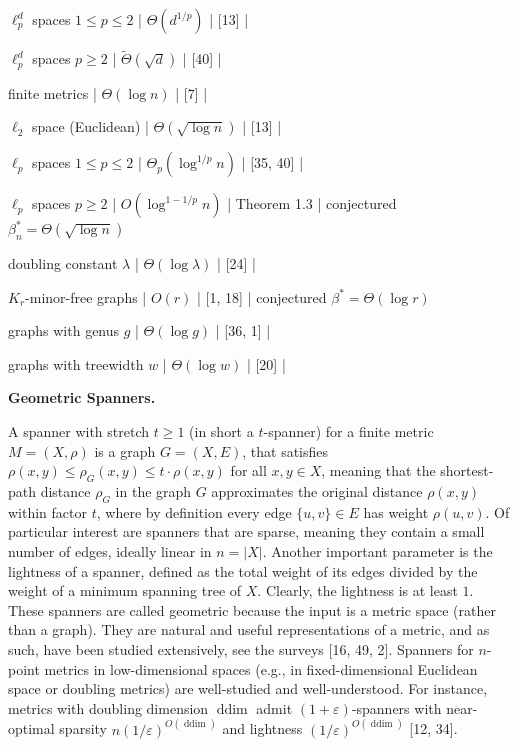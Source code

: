 \documentclass[10pt,a4paper]{amsart}
\begin{document}
\noindent  $\ell_{p}^{d}$ spaces $1\leq p\leq 2$  | $\Theta(d^{1/p})$ | [13] | \par
\noindent  $\ell_{p}^{d}$ spaces $p\geq 2$  | $\tilde{\Theta}(\sqrt{d})$ | [40] | \par
\noindent finite metrics | $\Theta(\log{n})$ | [7] | \par
\noindent  $\ell_{2}$ space (Euclidean) | $\Theta(\sqrt{\log{n}})$ | [13] | \par
\noindent  $\ell_{p}$ spaces $1\leq p\leq 2$  | $\Theta_{p}(\log^{1/p}{n})$ | [35, 40] | \par
\noindent  $\ell_{p}$ spaces $p\geq 2$  | $O(\log^{1-1/p}{n})$ | Theorem 1.3 | conjectured $\beta^{*}_{n}=\Theta(\sqrt{\log{n}})$ \par
\noindent doubling constant $\lambda$  | $\Theta(\log{\lambda})$ | [24] | \par
\noindent  $K_{r}$-minor-free graphs | $O(r)$ | [1, 18] | conjectured $\beta^{*}=\Theta(\log{r})$ \par
\noindent graphs with genus $g$  | $\Theta(\log{g})$ | [36, 1] | \par
\noindent graphs with treewidth $w$  | $\Theta(\log{w})$ | [20] | \par
\par\medskip\noindent\textbf{Geometric Spanners.}\par
A spanner with stretch $t\geq 1$ (in short a $t$-spanner) for a finite metric $M=(X,\rho)$ is a graph $G=(X,E)$, that satisfies $\rho(x,y)\leq\rho_{G}(x,y)\leq t\cdot\rho(x,y)$ for all $x,y\in X$, meaning that the shortest-path distance $\rho_{G}$ in the graph $G$ approximates the original distance $\rho(x,y)$ within factor $t$, where by definition every edge $\{u,v\}\in E$ has weight $\rho(u,v)$. Of particular interest are spanners that are sparse, meaning they contain a small number of edges, ideally linear in $n=|X|$. Another important parameter is the lightness of a spanner, defined as the total weight of its edges divided by the weight of a minimum spanning tree of $X$. Clearly, the lightness is at least $1$. These spanners are called geometric because the input is a metric space (rather than a graph). They are natural and useful representations of a metric, and as such, have been studied extensively, see the surveys [16, 49, 2]. Spanners for $n$-point metrics in low-dimensional spaces (e.g., in fixed-dimensional Euclidean space or doubling metrics) are well-studied and well-understood. For instance, metrics with doubling dimension $\operatorname{ddim}$ admit $(1+\varepsilon)$-spanners with near-optimal sparsity $n(1/\varepsilon)^{O(\operatorname{ddim})}$ and lightness $(1/\varepsilon)^{O(\operatorname{ddim})}$ [12, 34].
\end{document}
